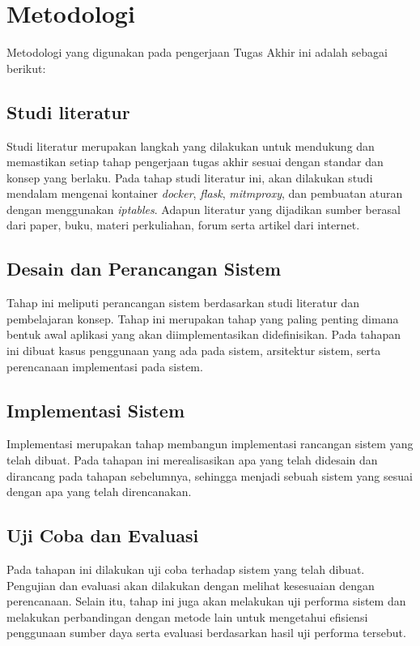      \section{Metodologi}
     Metodologi yang digunakan pada pengerjaan Tugas Akhir ini
adalah sebagai berikut:
     \subsection{Studi literatur}
     Studi literatur merupakan langkah yang dilakukan untuk mendukung dan memastikan setiap tahap pengerjaan tugas akhir sesuai dengan standar dan konsep yang berlaku. Pada tahap studi literatur ini, akan dilakukan studi mendalam mengenai kontainer \textit{docker}, \textit{flask}, \textit{mitmproxy}, dan pembuatan aturan dengan menggunakan \textit{iptables}. Adapun literatur yang dijadikan sumber berasal dari paper, buku, materi perkuliahan, forum serta artikel dari internet.

\subsection{Desain dan Perancangan Sistem}
Tahap ini meliputi perancangan sistem berdasarkan studi literatur dan pembelajaran konsep. Tahap ini merupakan tahap yang paling penting dimana bentuk awal aplikasi yang akan diimplementasikan didefinisikan. Pada tahapan ini dibuat kasus penggunaan yang ada pada sistem, arsitektur sistem, serta perencanaan implementasi pada sistem.
\subsection{Implementasi Sistem}
Implementasi merupakan tahap membangun implementasi rancangan sistem yang telah dibuat. Pada tahapan ini merealisasikan apa yang telah didesain dan dirancang pada tahapan sebelumnya, sehingga menjadi sebuah sistem yang sesuai dengan apa yang telah direncanakan.
\subsection{Uji Coba dan Evaluasi}
Pada tahapan ini dilakukan uji coba terhadap sistem yang telah dibuat. Pengujian dan evaluasi akan dilakukan dengan melihat kesesuaian dengan perencanaan. Selain itu, tahap ini juga akan melakukan uji performa sistem dan melakukan perbandingan dengan metode lain untuk mengetahui efisiensi penggunaan sumber daya serta evaluasi berdasarkan hasil uji performa tersebut. 

